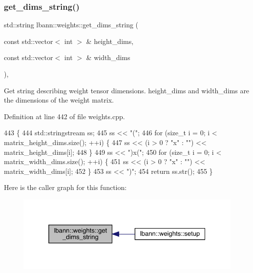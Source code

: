 \mbox{\label{classlbann_1_1weights_ac15d39b1d887c8ff927b0c29f667e752}} 
\subsubsection{\texorpdfstring{get\+\_\+dims\+\_\+string()}{get\_dims\_string()}}
{\footnotesize\ttfamily std\+::string lbann\+::weights\+::get\+\_\+dims\+\_\+string (\begin{DoxyParamCaption}\item[{const std\+::vector$<$ int $>$ \&}]{height\+\_\+dims,  }\item[{const std\+::vector$<$ int $>$ \&}]{width\+\_\+dims }\end{DoxyParamCaption})\hspace{0.3cm}{\ttfamily [static]}, {\ttfamily [private]}}

Get string describing weight tensor dimensions. height\+\_\+dims and width\+\_\+dims are the dimensions of the weight matrix. 

Definition at line 442 of file weights.\+cpp.


\begin{DoxyCode}
443                                                                               \{
444   std::stringstream ss;
445   ss << \textcolor{stringliteral}{"("};
446   \textcolor{keywordflow}{for} (\textcolor{keywordtype}{size\_t} i = 0; i < matrix\_height\_dims.size(); ++i) \{
447     ss << (i > 0 ? \textcolor{stringliteral}{"x"} : \textcolor{stringliteral}{""}) << matrix\_height\_dims[i];
448   \}
449   ss << \textcolor{stringliteral}{")x("};
450   \textcolor{keywordflow}{for} (\textcolor{keywordtype}{size\_t} i = 0; i < matrix\_width\_dims.size(); ++i) \{
451     ss << (i > 0 ? \textcolor{stringliteral}{"x"} : \textcolor{stringliteral}{""}) << matrix\_width\_dims[i];
452   \}
453   ss << \textcolor{stringliteral}{")"};
454   \textcolor{keywordflow}{return} ss.str();
455 \}
\end{DoxyCode}
Here is the caller graph for this function\+:\nopagebreak
\begin{figure}[H]
\begin{center}
\leavevmode
\includegraphics[width=325pt]{classlbann_1_1weights_ac15d39b1d887c8ff927b0c29f667e752_icgraph}
\end{center}
\end{figure}
\mbox{\label{classlbann_1_1weights_a448c8a6fa03048da9f3ae275d29c824d}} 
